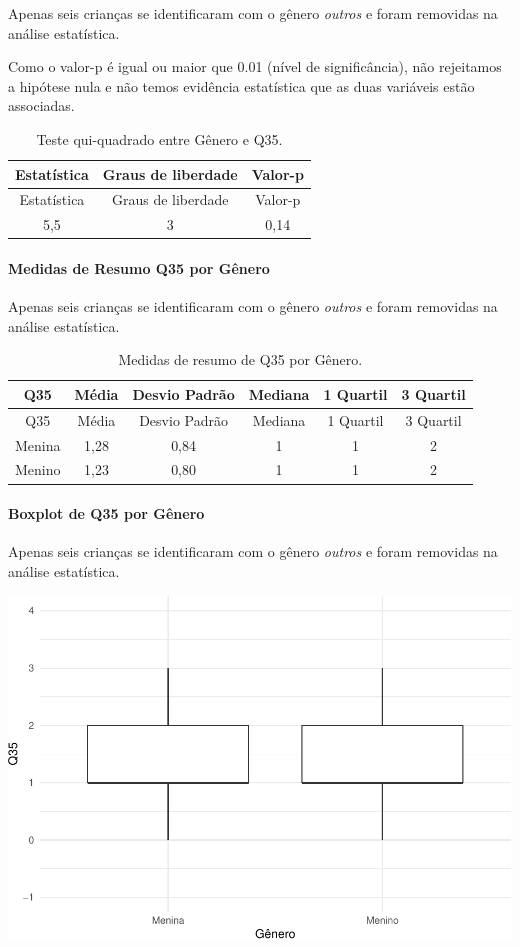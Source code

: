 \documentclass[]{article}
\let\oldparagraph\paragraph
\renewcommand{\paragraph}[1]{\oldparagraph{#1}\mbox{}}
\begin{document}
Apenas seis crianças se identificaram com o gênero \emph{outros} e foram removidas na análise estatística.

Como o valor-p é igual ou maior que 0.01 (nível de significância), não rejeitamos a hipótese nula e não temos evidência estatística que as duas variáveis estão associadas.

\begin{longtable}[]{@{}ccc@{}}
\caption{\label{tab:unnamed-chunk-1264}Teste qui-quadrado entre Gênero e Q35.}\tabularnewline
\toprule
Estatística & Graus de liberdade & Valor-p\tabularnewline
\midrule
\endfirsthead
\toprule
Estatística & Graus de liberdade & Valor-p\tabularnewline
\midrule
\endhead
5,5 & 3 & 0,14\tabularnewline
\bottomrule
\end{longtable}

\cleardoublepage

\hypertarget{medidas-de-resumo-q35-por-guxeanero}{%
\paragraph{Medidas de Resumo Q35 por Gênero}\label{medidas-de-resumo-q35-por-guxeanero}}

Apenas seis crianças se identificaram com o gênero \emph{outros} e foram removidas na análise estatística.

\begin{longtable}[]{@{}cccccc@{}}
\caption{\label{tab:unnamed-chunk-1265}Medidas de resumo de Q35 por Gênero.}\tabularnewline
\toprule
Q35 & Média & Desvio Padrão & Mediana & 1 Quartil & 3 Quartil\tabularnewline
\midrule
\endfirsthead
\toprule
Q35 & Média & Desvio Padrão & Mediana & 1 Quartil & 3 Quartil\tabularnewline
\midrule
\endhead
Menina & 1,28 & 0,84 & 1 & 1 & 2\tabularnewline
Menino & 1,23 & 0,80 & 1 & 1 & 2\tabularnewline
\bottomrule
\end{longtable}

\hypertarget{boxplot-de-q35-por-guxeanero}{%
\paragraph{Boxplot de Q35 por Gênero}\label{boxplot-de-q35-por-guxeanero}}

Apenas seis crianças se identificaram com o gênero \emph{outros} e foram removidas na análise estatística.

\begin{center}\includegraphics[width=0.75\linewidth]{relatorio_covid19_files/figure-latex/unnamed-chunk-1266-1} \end{center}
\end{document}
